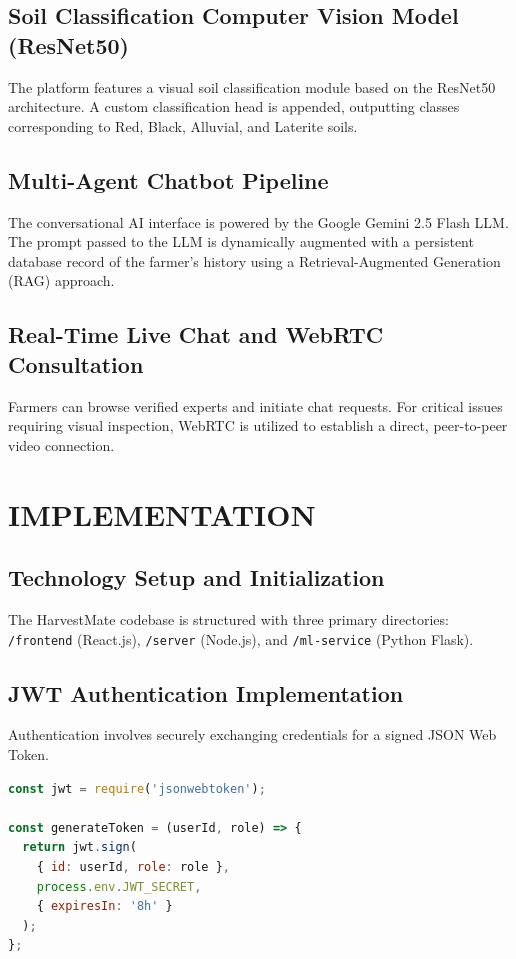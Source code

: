 \documentclass[12pt,a4paper]{report}
\begin{document}
\section{Soil Classification Computer Vision Model (ResNet50)}
The platform features a visual soil classification module based on the ResNet50 architecture. A custom classification head is appended, outputting classes corresponding to Red, Black, Alluvial, and Laterite soils.

\section{Multi-Agent Chatbot Pipeline}
The conversational AI interface is powered by the Google Gemini 2.5 Flash LLM. The prompt passed to the LLM is dynamically augmented with a persistent database record of the farmer's history using a Retrieval-Augmented Generation (RAG) approach.

\section{Real-Time Live Chat and WebRTC Consultation}
Farmers can browse verified experts and initiate chat requests. For critical issues requiring visual inspection, WebRTC is utilized to establish a direct, peer-to-peer video connection.

\chapter{IMPLEMENTATION}

\section{Technology Setup and Initialization}
The HarvestMate codebase is structured with three primary directories: \texttt{/frontend} (React.js), \texttt{/server} (Node.js), and \texttt{/ml-service} (Python Flask).

\section{JWT Authentication Implementation}
Authentication involves securely exchanging credentials for a signed JSON Web Token.

\begin{lstlisting}[language=JavaScript, caption={JWT Token Generation and Middleware (Node.js)}]
const jwt = require('jsonwebtoken');

const generateToken = (userId, role) => {
  return jwt.sign(
    { id: userId, role: role },
    process.env.JWT_SECRET,
    { expiresIn: '8h' }
  );
};
\end{lstlisting}
\end{document}
